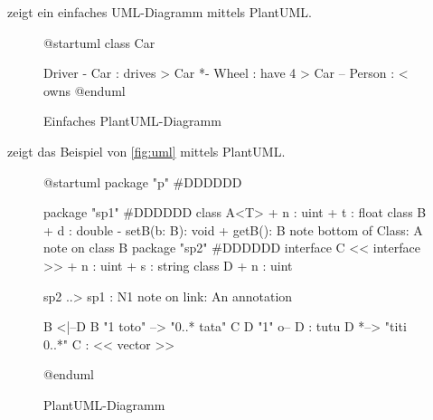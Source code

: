  zeigt ein einfaches UML-Diagramm mittels PlantUML.

\begin{figure}
  \centering
  \begin{plantuml}
  @startuml
    class Car

    Driver - Car : drives >
    Car *- Wheel : have 4 >
    Car -- Person : < owns
  @enduml
  \end{plantuml}
  \caption{Einfaches PlantUML-Diagramm}
  \label{fig:umlcar}
\end{figure}

 zeigt das Beispiel von \cref{fig:uml} mittels PlantUML.

\begin{figure}
  \centering
  \begin{plantuml}
    @startuml
    package "p" #DDDDDD {
      package "sp1" #DDDDDD {
        class A<T> {
          + n : uint
          + t : float
        }
        class B {
          + d : double
          - setB(b: B): void
          + getB(): B
        }
        note bottom of Class: A note on class B
      }
      package "sp2" #DDDDDD {
        interface  C << interface >> {
          + n : uint
          + s : string
        }
      }
      class D {
        + n : uint
      }

      sp2 ..> sp1 : N1
      note on link: An annotation

      B <|--D
      B "1 toto" --> "0..* tata" C
      D "1" o-- D : tutu
      D *--> "titi 0..*" C : << vector >>
    }
    @enduml
  \end{plantuml}
  \caption{PlantUML-Diagramm}
  \label{fig:plantuml}
\end{figure}
